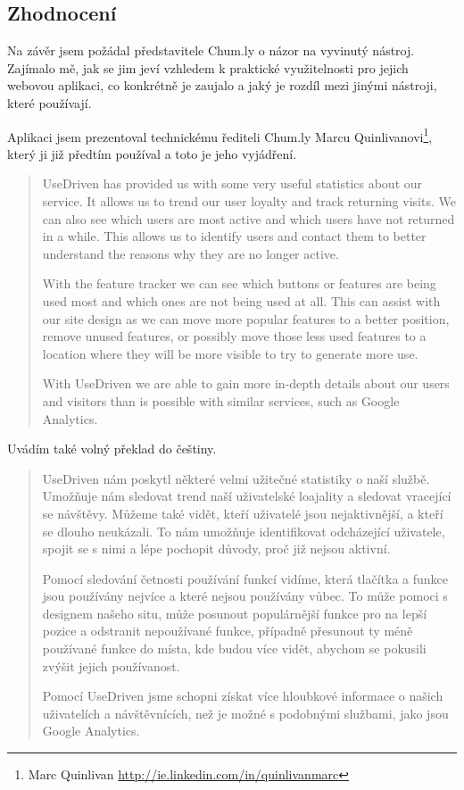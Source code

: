\documentclass[bc,male,java,dept456]{diploma}						%
\begin{document}
\subsection{Zhodnocení}

Na závěr jsem požádal představitele Chum.ly o názor na vyvinutý nástroj. Zajímalo mě, jak se jim jeví vzhledem k praktické využitelnosti pro jejich webovou aplikaci, co konkrétně je zaujalo a jaký je rozdíl mezi jinými nástroji, které používají.

Aplikaci jsem prezentoval technickému řediteli Chum.ly Marcu Quinlivanovi\footnote{Marc Quinlivan \url{http://ie.linkedin.com/in/quinlivanmarc}}, který ji již předtím používal a toto je jeho vyjádření.

\begin{quote}
UseDriven has provided us with some very useful statistics about our
service. It allows us to trend our user loyalty and track returning visits. We can also see which users are most active and which users have not
returned in a while. This allows us to identify users and contact them to better understand the reasons why they are no longer active.

With the feature tracker we can see which buttons or features are being used most and which ones are not being used at all. This can assist with our site design as we can move more popular features to a better position, remove unused features, or possibly move those less used features to a location where they will be more visible to try to generate more use.

With UseDriven we are able to gain more in-depth details about our users and visitors than is possible with similar services, such as Google
Analytics.
\end{quote}

Uvádím také volný překlad do češtiny.

\begin{quote}
UseDriven nám poskytl některé velmi užitečné statistiky o naší službě. Umožňuje nám sledovat trend naší uživatelské loajality a sledovat vracející se návštěvy. Můžeme také vidět, kteří uživatelé jsou nejaktivnější, a kteří se dlouho neukázali. To nám umožňuje identifikovat odcházející uživatele, spojit se s nimi a lépe pochopit důvody, proč již nejsou aktivní.

Pomocí sledování četnosti používání funkcí vidíme, která tlačítka a funkce jsou používány nejvíce a které nejsou používány vůbec. To může pomoci s designem našeho situ, může posunout populárnější funkce pro na lepší pozice a odstranit nepoužívané funkce, případně přesunout ty méně používané funkce do místa, kde budou více vidět, abychom se pokusili zvýšit jejich používanost.

Pomocí UseDriven jsme schopni získat více hloubkové informace o našich uživatelích a návštěvnících, než je možné s podobnými službami, jako jsou Google Analytics.
\end{quote}
\end{document}

